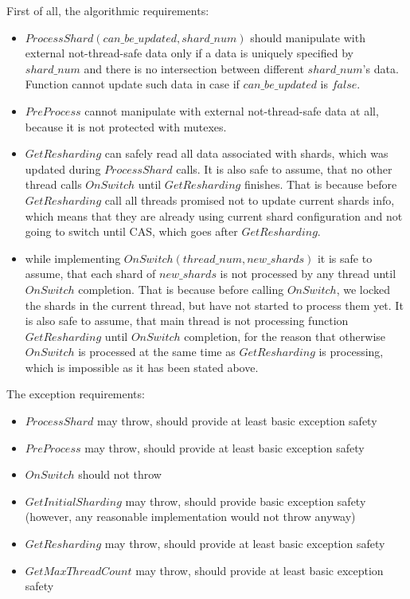 \documentclass{article}
\begin{document}
First of all, the algorithmic requirements:
\begin{itemize}
	\item $ProcessShard(can\_be\_updated, shard\_num)$ should manipulate with external not-thread-safe data only if a data is uniquely specified by $shard\_num$ and there is no intersection between different $shard\_num$'s data. Function cannot update such data in case if $can\_be\_updated$ is $false$.
	\item $PreProcess$ cannot manipulate with external not-thread-safe data at all, because it is not protected with mutexes.
	\item $GetResharding$ can safely read all data associated with shards, which was updated during $ProcessShard$ calls. It is also safe to assume, that no other thread calls $OnSwitch$ until $GetResharding$ finishes. That is because before $GetResharding$ call all threads promised not to update current shards info, which means that they are already using current shard configuration and not going to switch until CAS, which goes after $GetResharding$.
	\item while implementing $OnSwitch(thread\_num, new\_shards)$ it is safe to assume, that each shard of $new\_shards$ is not processed by any thread until $OnSwitch$ completion. That is because before calling $OnSwitch$, we locked the shards in the current thread, but have not started to process them yet. It is also safe to assume, that main thread is not processing function $GetResharding$ until $OnSwitch$ completion, for the reason that otherwise $OnSwitch$ is processed at the same time as $GetResharding$ is processing, which is impossible as it has been stated above.
\end{itemize}

The exception requirements:
\begin{itemize}
	\item $ProcessShard$ may throw, should provide at least basic exception safety
	\item $PreProcess$ may throw, should provide at least basic exception safety
	\item $OnSwitch$ should not throw
	\item $GetInitialSharding$ may throw, should provide basic exception safety (however, any reasonable implementation would not throw anyway)
	\item $GetResharding$ may throw, should provide at least basic exception safety
	\item $GetMaxThreadCount$ may throw, should provide at least basic exception safety
\end{itemize}
\end{document}
